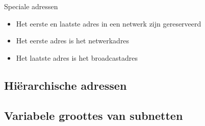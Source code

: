 \begin{frame}{Speciale adressen}
\begin{itemize}
\item Het eerste en laatste adres in een netwerk zijn gereserveerd
\item Het eerste adres is het \alert{netwerkadres}
\item Het laatste adres is het \alert{broadcastadres}
\end{itemize}
\end{frame}


\subsection{Hiërarchische adressen}

\begin{frame}
\end{frame}

\subsection{Variabele groottes van subnetten}

\begin{frame}
\end{frame}





